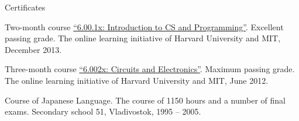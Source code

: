 \documentclass{template}
\begin{document}
\begin{rSection}{Certificates}
\begin{rItemize}
\item Two-month course \href{http://www.vova-ivanov.info/6.00.1x-Certificate.pdf}{\textquotedblleft 6.00.1x: Introduction to CS and Programming\textquotedblright}. Excellent passing grade. \newline
The online learning initiative of Harvard University and MIT, December 2013.
\item Three-month course \href{http://www.vova-ivanov.info/6.002x-Certificate.pdf}{\textquotedblleft 6.002x: Circuits and Electronics\textquotedblright}. Maximum passing grade. \newline
The online learning initiative of Harvard University and MIT, June 2012.
\item Course of Japanese Language. The course of 1150 hours and a number of final exams. \newline
Secondary school 51, Vladivostok, 1995 -- 2005.
\end{rItemize}
\end{rSection}

\end{document}
